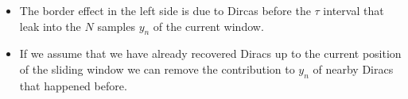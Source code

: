\documentclass[8pt]{beamer}
\begin{document}
\begin{frame}

\begin{itemize}

\item The border effect in the left side is due to Dircas before the $\tau$ interval
that leak into the $N$ samples $y_n$ of the current window.

\item<2-> If we assume that we have already recovered Diracs up to the current position of
the sliding window we can remove the contribution to $y_n$ of nearby Diracs that happened before.

\end{itemize}

\end{frame}
\end{document}
